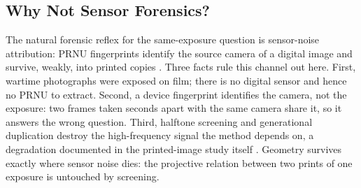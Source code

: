 \documentclass[letterpaper]{article} %
\begin{document}
\subsection{Why Not Sensor Forensics?}
The natural forensic reflex for the same-exposure question is sensor-noise
attribution: PRNU fingerprints identify the source camera of a digital image
\cite{lukas2006prnu} and survive, weakly, into printed copies
\cite{goljan2008printed}. Three facts rule this channel out here. First,
wartime photographs were exposed on film; there is no digital sensor and hence
no PRNU to extract. Second, a device fingerprint identifies the camera, not
the exposure: two frames taken seconds apart with the same camera share it, so
it answers the wrong question. Third, halftone screening and generational
duplication destroy the high-frequency signal the method depends on, a
degradation documented in the printed-image study itself
\cite{goljan2008printed}. Geometry survives exactly where sensor noise dies:
the projective relation between two prints of one exposure is untouched by
screening.
\end{document}
